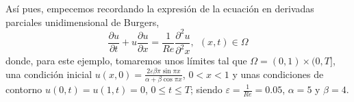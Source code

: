 Así pues, empecemos recordando la expresión de la ecuación en derivadas parciales unidimensional de Burgers,
\begin{equation}\label{BE2}
\frac{\partial u}{\partial t}+u \frac{\partial u}{\partial
	x}=\frac{1}{Re} \frac{\partial^2 u}{\partial^2 x}, \ \ (x,t)\in
\Omega
\end{equation}
donde, para este ejemplo, tomaremos unos límites tal que $\Omega=(0,1)\times(0,T]$, una condición inicial $u(x,0)=\frac{2 \varepsilon \beta \pi \sin{\pi x}}{\alpha+\beta \cos{\pi x}}$, $0<x<1$ y unas condiciones de contorno $u(0,t)=u(1,t)=0$, $0\leq t \leq T$; siendo $\varepsilon=\frac{1}{Re}=0.05$, $\alpha=5$ y $\beta=4$.


